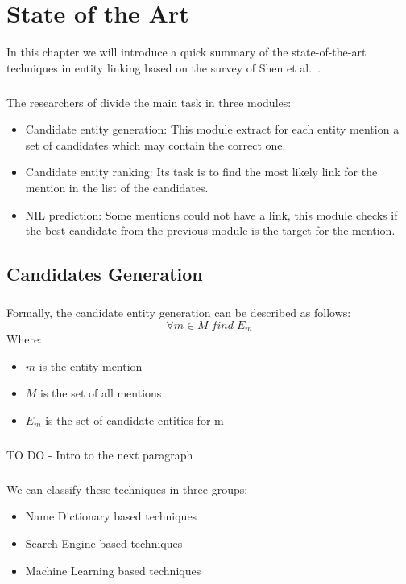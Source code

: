 \chapter{State of the Art}
In this chapter we will introduce a quick summary of the state-of-the-art techniques in entity linking based on the survey of Shen et al.~\cite{shen2015entity}.
\paragraph{}
The researchers of \cite{shen2015entity} divide the main task in three modules:
\begin{itemize}
\item Candidate entity generation: This module extract for each entity mention a set of candidates which may contain the correct one.
\item Candidate entity ranking: Its task is to find the most likely link for the mention in the list of the candidates.
\item NIL prediction: Some mentions could not have a link, this module checks if the best candidate from the previous module is the target for the mention. 
\end{itemize}

\section{Candidates Generation}
\paragraph{}
Formally, the candidate entity generation can be described as follows:
\[\forall m \in M \; find \; E_m\]
Where:

\begin{itemize}[noitemsep,  topsep=10pt]
\item $m$ is the entity mention
\item $M$ is the set of all mentions
\item $E_m$ is the set of candidate entities for m
\end{itemize}
\paragraph{} TO DO - Intro to the next paragraph

\paragraph{}
We can classify these techniques in three groups:
\begin{itemize}[noitemsep,  topsep=10pt]
\item Name Dictionary based techniques
\item Search Engine based techniques
\item Machine Learning based techniques
\end{itemize}

